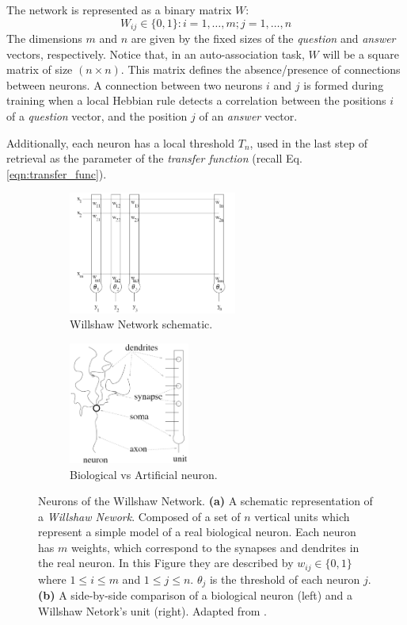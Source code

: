 \documentclass[runningheads]{llncs}
\begin{document}
The network is represented as a binary matrix $W$:
\begin{equation}
W_{ij} \in \{0,1\} : i=1, \ldots, m ;  j=1, \ldots, n
\end{equation}
The dimensions $m$ and $n$ are given by the fixed sizes of the \textit{question} and \textit{answer} vectors, respectively. Notice that, in an auto-association task, $W$ will be a square matrix of size $(n \times n)$. 
This matrix defines the absence/presence of connections between neurons. A connection between two neurons $i$ and $j$ is formed during training when a local Hebbian rule detects a correlation between the positions $i$ of a \textit{question} vector, and the position $j$ of an \textit{answer} vector.

Additionally, each neuron has a local threshold $T_n$, used in the last step of retrieval as the parameter of the \textit{transfer function} (recall Eq. \ref{eqn:transfer_func}).

\begin{figure}[htbp]
     \centering
     \begin{subfigure}[t]{0.4\textwidth}
         \centering
         \includegraphics[height=4cm]{img/wichert1.png}
         \caption{Willshaw Network schematic.}
         \label{WN1}
     \end{subfigure}
     \hfill
     \begin{subfigure}[t]{0.49\textwidth}
         \centering
         \includegraphics[height=4cm]{img/wichert2.png}
         \caption{Biological vs Artificial neuron.}
         \label{WN2}
     \end{subfigure}
     \hfill
        \caption{Neurons of the Willshaw Network. \textbf{(a)} A schematic representation of a \textit{Willshaw Nework}. Composed of a set of  $n$ vertical units which represent a simple model of a real biological neuron. Each neuron has $m$ weights, which correspond to the synapses and dendrites in the real neuron. In this Figure they are described by $w_{ij} \in  \{0,1\}$ where $1\leq i \leq m$ and $1 \leq j \leq n$. $\theta_j$ is the threshold of each neuron $j$. \textbf{(b)} A side-by-side comparison of a biological neuron (left) and a Willshaw Netork's unit (right).  Adapted from \cite{wichert2020principles}.}
        \label{fig:WN}
\end{figure}
\end{document}
